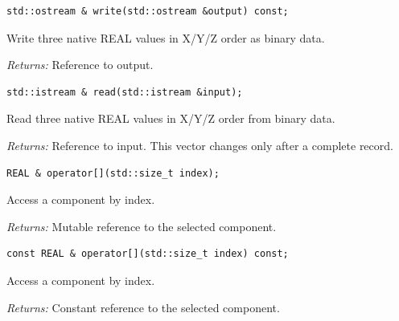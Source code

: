\par\noindent\begin{minipage}{\linewidth}
\begin{lstlisting}[style=apireference]
std::ostream & write(std::ostream &output) const;
\end{lstlisting}
{\footnotesize Write three native REAL values in X/Y/Z order as binary data.\par}
{\footnotesize\textit{Returns:} Reference to output.\par}
\end{minipage}\par\vspace{1pt}
\par\noindent\begin{minipage}{\linewidth}
\begin{lstlisting}[style=apireference]
std::istream & read(std::istream &input);
\end{lstlisting}
{\footnotesize Read three native REAL values in X/Y/Z order from binary data.\par}
{\footnotesize\textit{Returns:} Reference to input. This vector changes only after a complete record.\par}
\end{minipage}\par\vspace{1pt}
\par\noindent\begin{minipage}{\linewidth}
\begin{lstlisting}[style=apireference]
REAL & operator[](std::size_t index);
\end{lstlisting}
{\footnotesize Access a component by index.\par}
{\footnotesize\textit{Returns:} Mutable reference to the selected component.\par}
\end{minipage}\par\vspace{1pt}
\par\noindent\begin{minipage}{\linewidth}
\begin{lstlisting}[style=apireference]
const REAL & operator[](std::size_t index) const;
\end{lstlisting}
{\footnotesize Access a component by index.\par}
{\footnotesize\textit{Returns:} Constant reference to the selected component.\par}
\end{minipage}\par\vspace{1pt}
